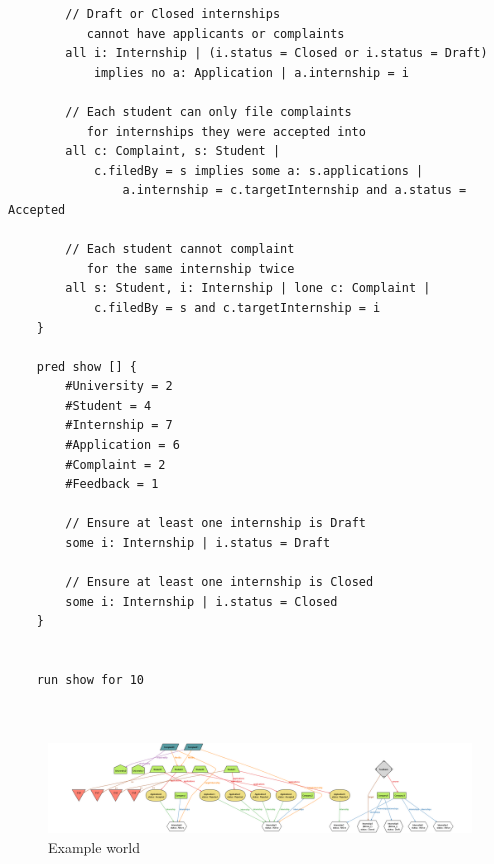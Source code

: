 \begin{verbatim}
        // Draft or Closed internships 
           cannot have applicants or complaints
        all i: Internship | (i.status = Closed or i.status = Draft)
            implies no a: Application | a.internship = i
    
        // Each student can only file complaints 
           for internships they were accepted into
        all c: Complaint, s: Student | 
            c.filedBy = s implies some a: s.applications | 
                a.internship = c.targetInternship and a.status = Accepted
    
        // Each student cannot complaint
           for the same internship twice
        all s: Student, i: Internship | lone c: Complaint |
            c.filedBy = s and c.targetInternship = i
    }
    
    pred show [] {
    	#University = 2
    	#Student = 4
    	#Internship = 7
    	#Application = 6
    	#Complaint = 2
    	#Feedback = 1
    
        // Ensure at least one internship is Draft
        some i: Internship | i.status = Draft
    
        // Ensure at least one internship is Closed
        some i: Internship | i.status = Closed
    }
    
    
    run show for 10

    
\end{verbatim}


 \begin{figure}[H]
    \includegraphics[width=\textwidth,height=\textheight,keepaspectratio]{RASD-Latex/assets/alloyWorld.png}
    \caption{Example world}
    \label{fig:DataRequest}
\end{figure}